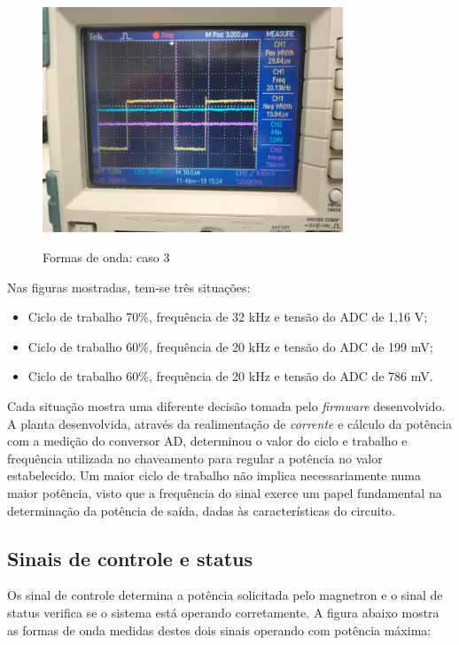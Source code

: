 \begin{figure}[H]
    \centering
    \caption{Formas de onda: caso 3}
    \includegraphics[width=0.8\textwidth]{./dados/figuras/onda_controller_3}
    \label{fig:figura-onda_controller_3}
\end{figure}

Nas figuras mostradas, tem-se três situações: 
\bigskip
\begin{itemize}
    \item Ciclo de trabalho 70\%, frequência de 32 kHz e tensão do ADC de 1,16 V;
    \item Ciclo de trabalho 60\%, frequência de 20 kHz e tensão do ADC de 199 mV;
    \item Ciclo de trabalho 60\%, frequência de 20 kHz e tensão do ADC de 786 mV.
\end{itemize}
\bigskip

Cada situação mostra uma diferente decisão tomada pelo \textit{firmware} desenvolvido. A planta desenvolvida, através da realimentação de \textit{corrente} e cálculo da potência com a medição do conversor AD, determinou o valor do ciclo e trabalho e frequência utilizada no chaveamento para regular a potência no valor estabelecido. Um maior ciclo de trabalho não implica necessariamente numa maior potência, visto que a frequência do sinal exerce um papel fundamental na determinação da potência de saída, dadas às características do circuito.

\subsection{Sinais de controle e status}
Os sinal de controle determina a potência solicitada pelo magnetron e o sinal de status verifica se o sistema está operando corretamente. A figura abaixo mostra as formas de onda medidas destes dois sinais operando com potência máxima:


